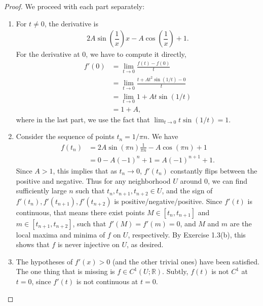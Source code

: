 \documentclass[12pt]{article}
\theoremstyle{remark}
\theoremstyle{named}
\newcommand{\R}{\mathbb R}
\begin{document}
\begin{proof}
    We proceed with each part separately:
    \begin{enumerate}
        \item For \(t \neq 0\), the derivative is
        \begin{align*}
            2A\sin\left(\dfrac{1}{x}\right)x-A\cos\left(\dfrac{1}{x}\right)+1.
        \end{align*}
        For the derivative at \(0\), we have to compute it directly, 
        \begin{align*}
            f'(0) &= \lim_{t \to 0} \frac{f(t) - f(0)}{t} \\
            &= \lim_{t \to 0} \frac{t + At^2 \sin(1/t) - 0}{t} \\
            &= \lim_{t \to 0} 1 + At\sin(1/t) \\
            &= 1 + A,
        \end{align*}
        where in the last part, we use the fact that \(\lim_{t \to 0} t \sin(1/t) = 1\).
        \item Consider the sequence of points \(t_n = 1 / \pi n\). We have 
        \begin{align*}
            f(t_n) &= 2A \sin(\pi n) \frac{1}{\pi n} - A \cos(\pi n) + 1 \\
            &= 0 - A (-1)^n + 1 = A (-1)^{n + 1} + 1.
        \end{align*}
        Since \(A > 1\), this implies that as \(t_n \to 0\), \(f'(t_n)\) constantly flips between the positive and negative. Thus for any neighborhood \(U\) around \(0\), we can find sufficiently large \(n\) such that \(t_n, t_{n + 1}, t_{n + 2} \in U\), and the sign of \(f'(t_n), f'(t_{n + 1}), f'(t_{n + 2})\) is positive/negative/positive. Since \(f'(t)\) is continuous, that means there exist points \(M \in [t_n, t_{n + 1}]\) and \(m \in [t_{n + 1}, t_{n + 2}]\), such that \(f'(M) = f'(m) = 0\), and \(M\) and \(m\) are the local maxima and minima of \(f\) on \(U\), respectively. By Exercise 1.3(b), this shows that \(f\) is never injective on \(U\), as desired.
        \item The hypotheses of \(f'(x) > 0\) (and the other trivial ones) have been satisfied. The one thing that is missing is \(f \in C^1(U;\R)\). Subtly, \(f(t)\) is not \(C^1\) at \(t = 0\), since \(f'(t)\) is not continuous at \(t = 0\).
    \end{enumerate}
\end{proof}
\end{document}
